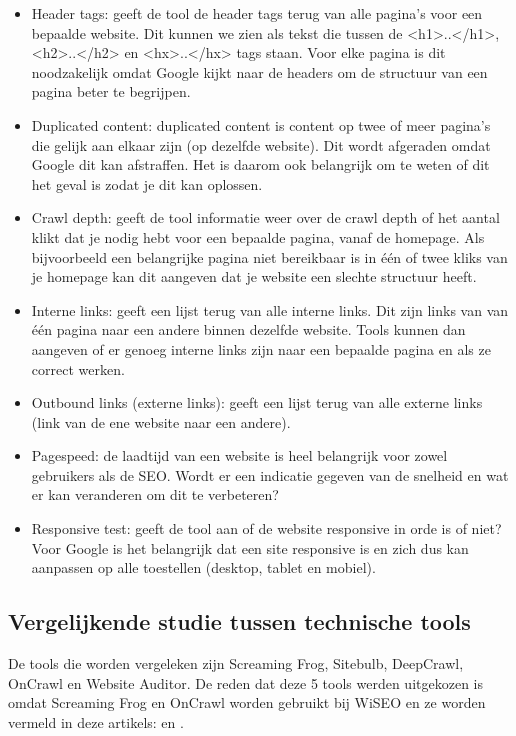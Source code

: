 \begin{itemize}
\item Header tags: geeft de tool de header tags terug van alle pagina’s voor een bepaalde website. Dit kunnen we zien als tekst die tussen de <h1>..</h1>, <h2>..</h2> en <hx>..</hx> tags staan. Voor elke pagina is dit noodzakelijk omdat Google kijkt naar de headers om de structuur van een pagina beter te begrijpen.  
\item Duplicated content: duplicated content is content op twee of meer pagina’s die gelijk aan elkaar zijn (op dezelfde website). Dit wordt afgeraden omdat Google dit kan afstraffen. Het is daarom ook belangrijk om te weten of dit het geval is zodat je dit kan oplossen. 
\item Crawl depth: geeft de tool informatie weer over de crawl depth of het aantal klikt dat je nodig hebt voor een bepaalde pagina, vanaf de homepage. Als bijvoorbeeld een belangrijke pagina niet bereikbaar is in één of twee kliks van je homepage kan dit aangeven dat je website een slechte structuur heeft.  
\item Interne links: geeft een lijst terug van alle interne links. Dit zijn links van van één pagina naar een andere binnen dezelfde website. Tools kunnen dan aangeven of er genoeg interne links zijn naar een bepaalde pagina en als ze correct werken. 
\item Outbound links (externe links): geeft een lijst terug van alle externe links (link van de ene website naar een andere). 
\item Pagespeed: de laadtijd van een website is heel belangrijk voor zowel gebruikers als de SEO. Wordt er een indicatie gegeven van de snelheid en wat er kan veranderen om dit te verbeteren? 
\item Responsive test: geeft de tool aan of de website responsive in orde is of niet? Voor Google is het belangrijk dat een site responsive is en zich dus kan aanpassen op alle toestellen (desktop, tablet en mobiel). 
\end{itemize}

\subsection{Vergelijkende studie tussen technische tools}
\label{ch: Vergelijkende studie tussen technische tools}

De tools die worden vergeleken zijn Screaming Frog, Sitebulb, DeepCrawl, OnCrawl en Website Auditor. De reden dat deze 5 tools werden uitgekozen is omdat Screaming Frog en OnCrawl worden gebruikt bij WiSEO en ze worden vermeld in deze artikels: \textcite{SEO13} en \textcite{SEOCOMPLETE}.  

